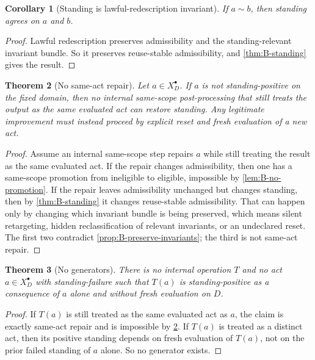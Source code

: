 \documentclass[11pt]{article}
\theoremstyle{plain}
\newtheorem{theorem}{Theorem}[section]
\newtheorem{corollary}[theorem]{Corollary}
\theoremstyle{definition}
\newcommand{\Law}{\sim}
\newcommand{\Eval}{X_D^{\bullet}}
\newcommand{\domain}{D}
\begin{document}
\begin{corollary}[Standing is lawful-redescription invariant]
If $a\Law b$, then standing agrees on $a$ and $b$.
\end{corollary}

\begin{proof}
Lawful redescription preserves admissibility and the standing-relevant invariant bundle. So it preserves reuse-stable admissibility, and \cref{thm:B-standing} gives the result.
\end{proof}

\begin{theorem}[No same-act repair]
\label{thm:B-no-repair}
Let $a\in\Eval$. If $a$ is not standing-positive on the fixed domain, then no internal same-scope post-processing that still treats the output as the same evaluated act can restore standing. Any legitimate improvement must instead proceed by explicit reset and fresh evaluation of a new act.
\end{theorem}

\begin{proof}
Assume an internal same-scope step repairs $a$ while still treating the result as the same evaluated act. If the repair changes admissibility, then one has a same-scope promotion from ineligible to eligible, impossible by \cref{lem:B-no-promotion}. If the repair leaves admissibility unchanged but changes standing, then by \cref{thm:B-standing} it changes reuse-stable admissibility. That can happen only by changing which invariant bundle is being preserved, which means silent retargeting, hidden reclassification of relevant invariants, or an undeclared reset. The first two contradict \cref{prop:B-preserve-invariants}; the third is not same-act repair.
\end{proof}

\begin{theorem}[No generators]
\label{thm:B-no-generators}
There is no internal operation $T$ and no act $a\in\Eval$ with standing-failure such that $T(a)$ is standing-positive as a consequence of $a$ alone and without fresh evaluation on $\domain$.
\end{theorem}

\begin{proof}
If $T(a)$ is still treated as the same evaluated act as $a$, the claim is exactly same-act repair and is impossible by \cref{thm:B-no-repair}. If $T(a)$ is treated as a distinct act, then its positive standing depends on fresh evaluation of $T(a)$, not on the prior failed standing of $a$ alone. So no generator exists.
\end{proof}
\end{document}
